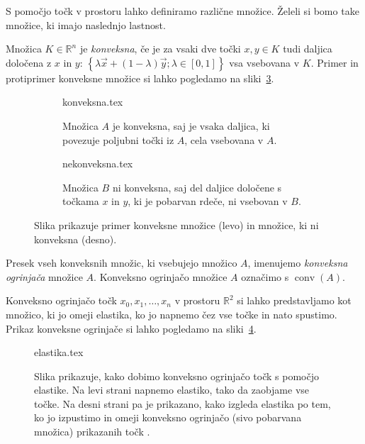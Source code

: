 \documentclass[mat1]{fmfdelo}
\newcommand{\R}{\mathbb R}
\DeclareMathOperator{\conv}{conv}
\newcommand{\0}{0}
\begin{document}
S pomočjo točk v prostoru lahko definiramo različne množice. Želeli si bomo take množice, ki imajo naslednjo lastnost.
\begin{definicija}
Množica $K \in \R^n$ je \emph{konveksna}, če je za vsaki dve točki $x, y \in K$ tudi daljica določena z $x$ in $y$: 
$\left \{ \lambda \vec{x} + (1 - \lambda) \vec{y}; \lambda \in  [0, 1] \right \}$ 
vsa vsebovana v $K$. Primer in protiprimer konveksne množice si lahko pogledamo na sliki~\ref{fig:konveksnost}.
\begin{figure}[h]  
\centering 
	\begin{subfigure}[b]{0.4\linewidth} 
	\centering
		{konveksna.tex}%
		\caption{Množica $A$ je konveksna, saj je vsaka daljica, ki povezuje poljubni točki iz $A$, cela vsebovana v $A$.}\label{fig:konv}
	\end{subfigure}
	\hspace{1cm}
	\begin{subfigure}[b]{0.4\linewidth}
	\centering
		{nekonveksna.tex}%
		\caption{Množica $B$ ni konveksna, saj del daljice določene s točkama $x$ in $y$, ki je pobarvan rdeče, ni vsebovan v $B$.} \label{fig:nikonv}  
	\end{subfigure}
\caption{Slika prikazuje primer konveksne množice (levo) in množice, ki ni konveksna (desno).}\label{fig:konveksnost} 
\end{figure}
\end{definicija}

\begin{definicija}\label{trd:presek-konv}
Presek vseh konveksnih množic, ki vsebujejo množico $A$, imenujemo \emph{konveksna ogrinjača} množice $A$. Konveksno ogrinjačo množice $A$ označimo s $\conv(A)$.
\end{definicija}

Konveksno ogrinjačo točk $x_0, x_1, \dots, x_n$ v prostoru $\R^2$ si lahko predstavljamo kot množico, ki jo omeji elastika, ko jo napnemo čez vse točke in nato spustimo. Prikaz konveksne ogrinjače si lahko pogledamo na sliki~\ref{fig:konvexhull}.
\begin{figure}[h]  
\centering 
	{elastika.tex}%
	\caption{Slika prikazuje, kako dobimo konveksno ogrinjačo točk s pomočjo elastike. Na levi strani napnemo elastiko, tako da zaobjame vse točke. Na desni strani pa je prikazano, kako izgleda elastika po tem, ko jo izpustimo in omeji konveksno ogrinjačo (sivo pobarvana množica) prikazanih točk .} \label{fig:konvexhull}
\end{figure} 
\end{document}
